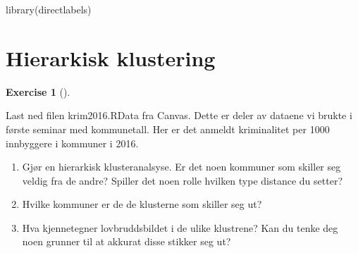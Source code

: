 \documentclass[
  letterpaper,
  DIV=11,
  numbers=noendperiod]{scrreprt}
\newenvironment{Shaded}{\begin{snugshade}}{\end{snugshade}}
\newcommand{\FunctionTok}[1]{\textcolor[rgb]{0.28,0.35,0.67}{#1}}
\newcommand{\NormalTok}[1]{\textcolor[rgb]{0.00,0.23,0.31}{#1}}
\providecommand{\tightlist}{%
  \setlength{\itemsep}{0pt}\setlength{\parskip}{0pt}}\usepackage{longtable,booktabs,array}
\theoremstyle{definition}
\newtheorem{exercise}{Exercise}[chapter]
\theoremstyle{remark}
\begin{document}
\begin{Shaded}
\begin{Highlighting}[]
\FunctionTok{library}\NormalTok{(directlabels)}
\end{Highlighting}
\end{Shaded}

\hypertarget{hierarkisk-klustering}{%
\section{Hierarkisk klustering}\label{hierarkisk-klustering}}

\leavevmode{}%
\begin{exercise}[]\label{exr-}

Last ned filen krim2016.RData fra Canvas. Dette er deler av dataene vi
brukte i første seminar med kommunetall. Her er det anmeldt kriminalitet
per 1000 innbyggere i kommuner i 2016.

\begin{enumerate}
\def\labelenumi{\alph{enumi})}
\tightlist
\item
  Gjør en hierarkisk klusteranalsyse. Er det noen kommuner som skiller
  seg veldig fra de andre? Spiller det noen rolle hvilken type distance
  du setter?
\item
  Hvilke kommuner er de de klusterne som skiller seg ut?
\item
  Hva kjennetegner lovbruddsbildet i de ulike klustrene? Kan du tenke
  deg noen grunner til at akkurat disse stikker seg ut?
\end{enumerate}

\end{exercise}
\end{document}
